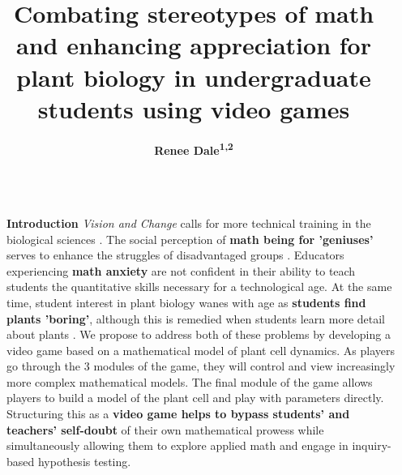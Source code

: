 \documentclass[final]{beamer}
\title{ \color{Grey} Combating stereotypes of math and enhancing appreciation for plant biology in undergraduate students using video games } %
\author{\color{Grey}\textbf{Renee Dale\textsuperscript{1,2}} } %
\institute{\color{Grey}Biological Sciences\textsuperscript{1}   $\qquad$        Experimental Statistics\textsuperscript{2} $\qquad$  \\ Louisiana State University} %
\newlength{\sepwid}
\newlength{\onecolwid}
\begin{document}

\setlength{\belowcaptionskip}{2ex} %
\setlength\belowdisplayshortskip{2ex} %

\begin{frame}[t] %
\begin{columns}[t] %

\begin{column}{\sepwid}\end{column} %

\begin{column}{\onecolwid} %


\begin{block}{\color{Grey}\textbf{Introduction}}
\small{\textit{Vision and Change} calls for more technical training in the biological sciences \cite{visionchange}. The social perception of\textbf{ math being for 'geniuses' }serves to enhance the struggles of disadvantaged groups \cite{ams,genius}. Educators experiencing \textbf{math anxiety} are not confident in their ability to teach students the quantitative skills necessary for a technological age. At the same time, student interest in plant biology wanes with age as \textbf{students find plants 'boring'}, although this is remedied when students learn more detail about plants \cite{plantinterest1}. We propose to address both of these problems by developing a video game based on a mathematical model of plant cell dynamics. As players go through the 3 modules of the game, they will control and view increasingly more complex mathematical models. The final module of the game allows players to build a model of the plant cell and play with parameters directly. Structuring this as a \textbf{video game helps to bypass students' and teachers' self-doubt }of their own mathematical prowess while simultaneously allowing them to explore applied math and engage in inquiry-based hypothesis testing.}
\end{block}


\end{column}
\end{columns}
\end{frame}
\end{document}
